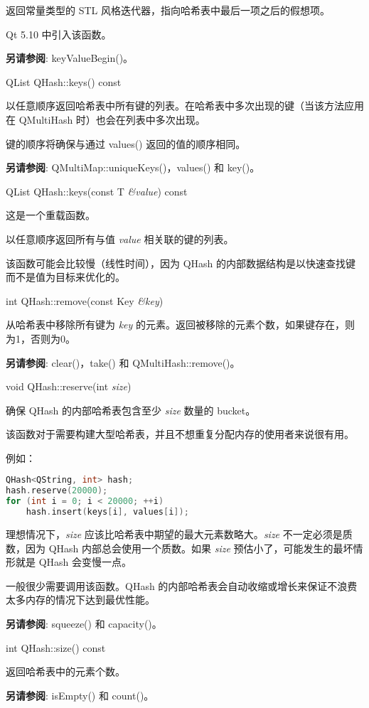 返回常量类型的 STL 风格迭代器，指向哈希表中最后一项之后的假想项。

Qt 5.10 中引入该函数。

\textbf{另请参阅}: keyValueBegin()。

QList QHash::keys() const

以任意顺序返回哈希表中所有键的列表。在哈希表中多次出现的键（当该方法应用在 QMultiHash 时）也会在列表中多次出现。

键的顺序将确保与通过 values() 返回的值的顺序相同。

\textbf{另请参阅}: QMultiMap::uniqueKeys()，values() 和 key()。

QList QHash::keys(const T \emph{\&value}) const

这是一个重载函数。

以任意顺序返回所有与值 \emph{value} 相关联的键的列表。

该函数可能会比较慢（线性时间），因为 QHash 的内部数据结构是以快速查找键而不是值为目标来优化的。

int QHash::remove(const Key \emph{\&key})

从哈希表中移除所有键为 \emph{key} 的元素。返回被移除的元素个数，如果键存在，则为1，否则为0。

\textbf{另请参阅}: clear()，take() 和 QMultiHash::remove()。

void QHash::reserve(int \emph{size})

确保 QHash 的内部哈希表包含至少 \emph{size} 数量的 bucket。

该函数对于需要构建大型哈希表，并且不想重复分配内存的使用者来说很有用。

例如：

\begin{lstlisting}[language=C++]
QHash<QString, int> hash;
hash.reserve(20000);
for (int i = 0; i < 20000; ++i)
    hash.insert(keys[i], values[i]);
\end{lstlisting}

理想情况下，\emph{size} 应该比哈希表中期望的最大元素数略大。\emph{size} 不一定必须是质数，因为 QHash 内部总会使用一个质数。如果 \emph{size} 预估小了，可能发生的最坏情形就是 QHash 会变慢一点。

一般很少需要调用该函数。QHash 的内部哈希表会自动收缩或增长来保证不浪费太多内存的情况下达到最优性能。

\textbf{另请参阅}: squeeze() 和 capacity()。

int QHash::size() const

返回哈希表中的元素个数。

\textbf{另请参阅}: isEmpty() 和 count()。

